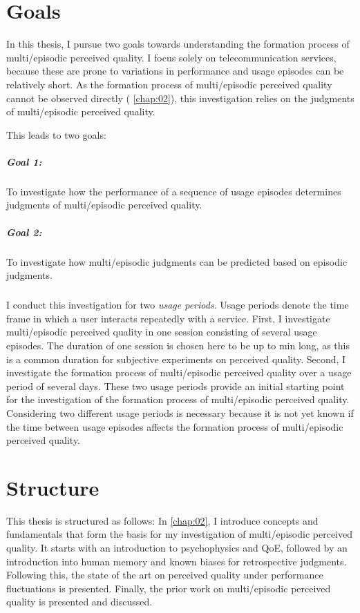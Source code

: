 \section{Goals}
In this thesis, I pursue two goals towards understanding the formation process of multi\-/episodic perceived quality.
I focus solely on telecommunication services, because these are prone to variations in performance and usage episodes can be relatively short.
As the formation process of multi\-/episodic perceived quality cannot be observed directly (\cf{} \autoref{chap:02}), this investigation relies on the judgments of multi\-/episodic perceived quality.

This leads to two goals:

\subparagraph*{Goal 1:}
To investigate how the performance of a sequence of usage episodes determines judgments of multi\-/episodic perceived quality.

\subparagraph*{Goal 2:}
To investigate how multi\-/episodic judgments can be predicted based on episodic judgments.

\subparagraph*{}
I conduct this investigation for two \emph{usage periods}.
Usage periods denote the time frame in which a user interacts repeatedly with a service.
First, I investigate multi\-/episodic perceived quality in one session consisting of several usage episodes.
The duration of one session is chosen here to be up to \unit[45]{min} long, as this is a common duration for subjective experiments on perceived quality.
Second, I investigate the formation process of multi\-/episodic perceived quality over a usage period of several days.
These two usage periods provide an initial starting point for the investigation of the formation process of multi\-/episodic perceived quality.
Considering two different usage periods is necessary because it is not yet known if the time between usage episodes affects the formation process of multi\-/episodic perceived quality.

\section{Structure}
This thesis is structured as follows:
In \autoref{chap:02}, I introduce concepts and fundamentals that form the basis for my investigation of multi\-/episodic perceived quality.
It starts with an introduction to psychophysics and \ac{QoE}, followed by an introduction into human memory and known biases for retrospective judgments.
Following this, the state of the art on perceived quality under performance fluctuations is presented.
Finally, the prior work on multi\-/episodic perceived quality is presented and discussed.

